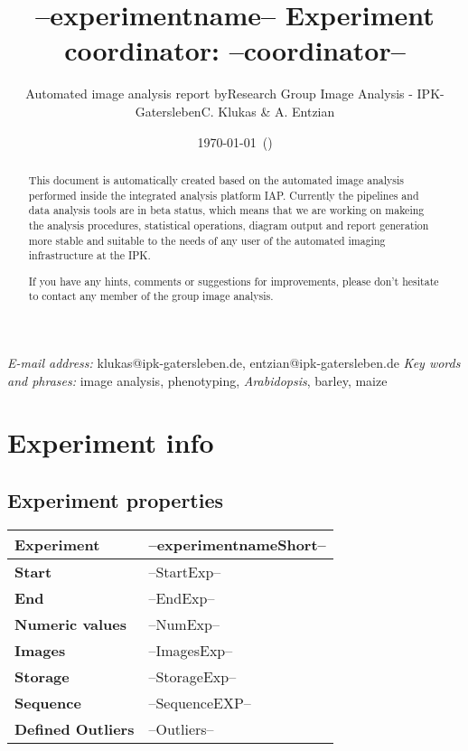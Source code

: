% 





\title{--experimentname-- \tabularnewline \vspace{10 mm} \large{Experiment coordinator: --coordinator--}}

\author{Automated image analysis report by\tabularnewline Research
Group Image Analysis - IPK-Gatersleben\tabularnewline \tabularnewline C. Klukas
\& A. Entzian}

\date{\today ~(\currenttime )}

\maketitle
\thispagestyle{empty}  
\begin{abstract}
This document is automatically created based on the automated image analysis performed 
inside the integrated analysis platform IAP. Currently the pipelines and data analysis tools are in beta status, 
which means that we are working on makeing the analysis procedures, statistical operations, diagram output and report
generation more stable and suitable to the needs of any user of the automated imaging infrastructure at the IPK.

If you have any hints, comments or suggestions for improvements, please don't hesitate to contact any member
of the group image analysis.
\end{abstract}
\vfill
\small{\textit{E-mail address:} klukas@ipk-gatersleben.de, entzian@ipk-gatersleben.de}
\newline 
\small{\textit{Key words and phrases:} image analysis, phenotyping, \textit{Arabidopsis}, barley, maize }
 
\addtocounter{page}{-1}
\clearpage
\tableofcontents

\clearpage
\pagestyle{headings}
\section{Experiment info} 
\subsection{Experiment properties}
\begin{center}
	\begin{tabular}{|p{3cm}|p{13cm}|}
	\hline
	{\textbf{Experiment}} & --experimentnameShort--\tabularnewline
	\hline
	\hline
	{\textbf{Start}} & --StartExp--\tabularnewline
	\hline
	{\textbf{End}} & --EndExp--\tabularnewline
	\hline
	{\textbf{Numeric values}} & --NumExp-- \tabularnewline
	\hline
	{\textbf{Images}} & --ImagesExp-- \tabularnewline
	\hline
	{\textbf{Storage}} & --StorageExp-- \tabularnewline
	\hline
	{\textbf{Sequence}} & --SequenceEXP-- \tabularnewline
	\hline
	{\textbf{Defined Outliers}} & --Outliers-- \tabularnewline
	\hline
	\hline 
	\end{tabular}
\end{center}

